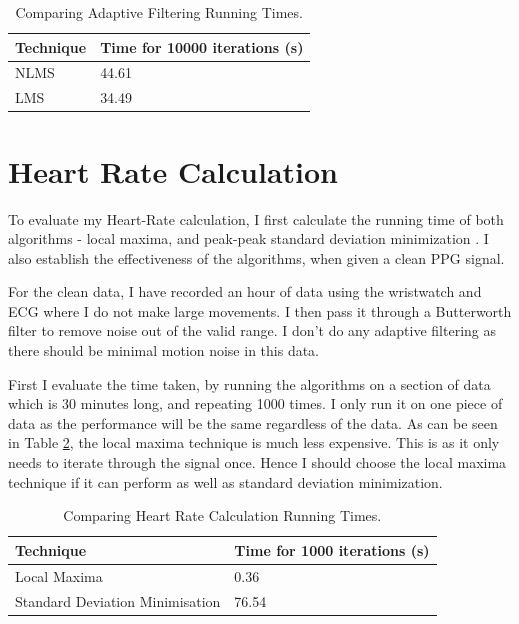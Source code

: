 \documentclass[12pt,a4paper,twoside,openany]{report}
\begin{document}
\begin{table}[H]
\centering
\caption{Comparing Adaptive Filtering Running Times.}
\label{table:lms-nlms-time}
\begin{tabular}{|l|l|}
\hline
Technique               & Time for 10000 iterations (s) \\ \hline
NLMS                    & 44.61                         \\
LMS                     & 34.49                         \\
\hline
\end{tabular}
\end{table}


\section{Heart Rate Calculation}

To evaluate my Heart-Rate calculation, I first calculate the running time of
both algorithms - local maxima, and peak-peak standard deviation minimization
. I also establish the effectiveness of the algorithms, when given a clean
PPG signal.

For the clean data, I have recorded an hour of data using the wristwatch and ECG
where I do not make large movements. I then pass it through a Butterworth filter to remove
noise out of the valid range. I don't do any adaptive filtering as
there should be minimal motion noise in this data.

First I evaluate the time taken, by running the algorithms on a section of
data which is 30 minutes long, and repeating 1000 times. I only run it on one
piece of data as the performance will be the same regardless of the data. 
As can be seen in Table \ref{table:hr-times},
the local maxima technique is much less expensive. This is as it only needs to
iterate through the signal once. Hence I should choose the local maxima
technique if it can perform as well as standard deviation minimization.

\begin{table}[]
\centering
\caption{Comparing Heart Rate Calculation Running Times.}
\label{table:hr-times}
\begin{tabular}{|l|l|}
\hline
Technique                       & Time for 1000 iterations (s) \\ \hline
Local Maxima                    & 0.36                         \\
Standard Deviation Minimisation & 76.54                        \\
\hline
\end{tabular}
\end{table}
\end{document}
